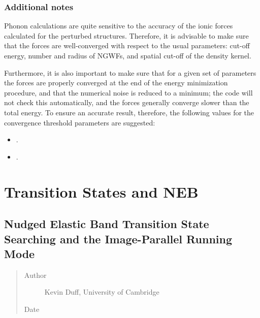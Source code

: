 \documentclass[letterpaper,10pt,english]{sphinxmanual}
\begin{document}
\subsection{Additional notes}
\label{\detokenize{phonons:additional-notes}}
Phonon calculations are quite sensitive to the accuracy of the ionic
forces calculated for the perturbed structures. Therefore, it is
advisable to make sure that the forces are well-converged with respect
to the usual parameters: cut-off energy, number and radius of NGWFs, and
spatial cut-off of the density kernel.

Furthermore, it is also important to make sure that for a given set of
parameters the forces are properly converged at the end of the energy
minimization procedure, and that the numerical noise is reduced to a
minimum; the code will not check this automatically, and the forces
generally converge slower than the total energy. To ensure an accurate
result, therefore, the following values for the convergence threshold
parameters are suggested:
\begin{itemize}
\item {} 
.

\item {} 
.

\end{itemize}


\chapter{Transition States and NEB}
\label{\detokenize{index_transition_states::doc}}\label{\detokenize{index_transition_states:transition-states-and-neb}}

\section{Nudged Elastic Band Transition State Searching and the Image-Parallel Running Mode}
\label{\detokenize{nudged-elastic-band::doc}}\label{\detokenize{nudged-elastic-band:nudged-elastic-band-transition-state-searching-and-the-image-parallel-running-mode}}\begin{quote}\begin{description}
\item[{Author}] \leavevmode
Kevin Duff, University of Cambridge

\item[{Date}] 

\end{description}\end{quote}
\end{document}
